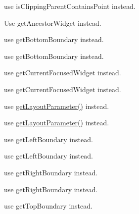 \begin{DoxyRefList}
use {\ttfamily is\+Clipping\+Parent\+Contains\+Point} instead.  
\item[\label{deprecated__deprecated000416}%
\Hypertarget{deprecated__deprecated000416}%
Member \hyperlink{classui_1_1Widget_a84a716b7fe8a0e98444a6a231e011fe0}{ui\+:\+:Widget\+:\+:get\+Ancenster\+Widget} (\hyperlink{classNode}{Node} $\ast$node)]Use get\+Ancestor\+Widget instead.  
\item[\label{deprecated__deprecated000169}%
\Hypertarget{deprecated__deprecated000169}%
Member \hyperlink{classui_1_1Widget_a91d67290067178a0a7534edb06756495}{ui\+:\+:Widget\+:\+:get\+Bottom\+In\+Parent} ()]use {\ttfamily get\+Bottom\+Boundary} instead. 

use {\ttfamily get\+Bottom\+Boundary} instead.  
\item[\label{deprecated__deprecated000180}%
\Hypertarget{deprecated__deprecated000180}%
Member \hyperlink{classui_1_1Widget_ae577cff6759bee4c6de4ff9a8ec459ab}{ui\+:\+:Widget\+:\+:get\+Current\+Focused\+Widget} (bool is\+Widget)]use {\ttfamily get\+Current\+Focused\+Widget} instead. 

use {\ttfamily get\+Current\+Focused\+Widget} instead.  
\item[\label{deprecated__deprecated000179}%
\Hypertarget{deprecated__deprecated000179}%
Member \hyperlink{classui_1_1Widget_a21caaf4dc8eb3c5b9e4ca4873ffc049d}{ui\+:\+:Widget\+:\+:get\+Layout\+Parameter} (\hyperlink{classui_1_1LayoutParameter_a1b01e01e7e6fc3de80f2e6d07fae806e}{Layout\+Parameter\+::\+Type} type)]use {\ttfamily \hyperlink{classui_1_1Widget_a25425cde194b4f37f56f938bb69a9a96}{get\+Layout\+Parameter()}} instead. 

use {\ttfamily \hyperlink{classui_1_1Widget_a25425cde194b4f37f56f938bb69a9a96}{get\+Layout\+Parameter()}} instead.  
\item[\label{deprecated__deprecated000168}%
\Hypertarget{deprecated__deprecated000168}%
Member \hyperlink{classui_1_1Widget_a316405b0bce9cb99a3efcef9b9754a86}{ui\+:\+:Widget\+:\+:get\+Left\+In\+Parent} ()]use {\ttfamily get\+Left\+Boundary} instead. 

use {\ttfamily get\+Left\+Boundary} instead.  
\item[\label{deprecated__deprecated000170}%
\Hypertarget{deprecated__deprecated000170}%
Member \hyperlink{classui_1_1Widget_ad64a744c35c0ee24d1239c02dad5c03c}{ui\+:\+:Widget\+:\+:get\+Right\+In\+Parent} ()]use {\ttfamily get\+Right\+Boundary} instead. 

use {\ttfamily get\+Right\+Boundary} instead.  
\item[\label{deprecated__deprecated000171}%
\Hypertarget{deprecated__deprecated000171}%
Member \hyperlink{classui_1_1Widget_a3a4efd935d1f5e58f1ee1d56dd493607}{ui\+:\+:Widget\+:\+:get\+Top\+In\+Parent} ()]use {\ttfamily get\+Top\+Boundary} instead. 


\end{DoxyRefList}
